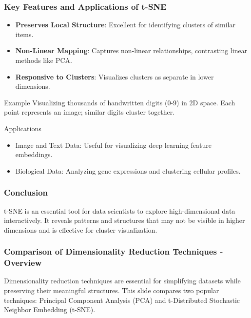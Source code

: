 \documentclass[aspectratio=169]{beamer}
\begin{document}
\begin{frame}[fragile]
    \frametitle{Key Features and Applications of t-SNE}
    \begin{itemize}
        \item \textbf{Preserves Local Structure}: Excellent for identifying clusters of similar items.
        \item \textbf{Non-Linear Mapping}: Captures non-linear relationships, contrasting linear methods like PCA.
        \item \textbf{Responsive to Clusters}: Visualizes clusters as separate in lower dimensions.
    \end{itemize}

    \begin{block}{Example}
        Visualizing thousands of handwritten digits (0-9) in 2D space. Each point represents an image; similar digits cluster together.
    \end{block}

    \begin{block}{Applications}
        \begin{itemize}
            \item Image and Text Data: Useful for visualizing deep learning feature embeddings.
            \item Biological Data: Analyzing gene expressions and clustering cellular profiles.
        \end{itemize}
    \end{block}
\end{frame}

\begin{frame}[fragile]
    \frametitle{Conclusion}
    t-SNE is an essential tool for data scientists to explore high-dimensional data interactively. It reveals patterns and structures that may not be visible in higher dimensions and is effective for cluster visualization.
\end{frame}

\begin{frame}[fragile]
    \frametitle{Comparison of Dimensionality Reduction Techniques - Overview}
    Dimensionality reduction techniques are essential for simplifying datasets while preserving their meaningful structures. This slide compares two popular techniques: Principal Component Analysis (PCA) and t-Distributed Stochastic Neighbor Embedding (t-SNE). 
\end{frame}
\end{document}
